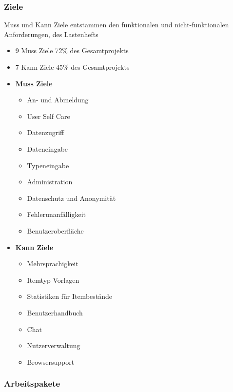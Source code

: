 \documentclass[11pt,a4paper]{report}
\begin{document}
\subsubsection{Ziele}

Muss und Kann Ziele entstammen den funktionalen und nicht-funktionalen Anforderungen, des Lastenhefts
  \begin{itemize}
  \item 9 Muss Ziele 72\% des Gesamtprojekts
  \item 7 Kann Ziele 45\% des Gesamtprojekts
  \end{itemize}



\begin{itemize}
\item[]
  \textbf{Muss Ziele}
  
  \begin{itemize}
  	\item
  		An- und Abmeldung
  	\item
  		User Self Care
	\item
  		Datenzugriff
	\item
 		Dateneingabe
	\item
  		Typeneingabe
	\item
  		Administration
	\item
  		Datenschutz und Anonymität
	\item
  		Fehlerunanfälligkeit
	\item
  		Benutzeroberfläche
  \end{itemize}

\item[]
  \textbf{Kann Ziele}
  
  \begin{itemize}
  	\item
  		Mehrsprachigkeit
	\item
  		Itemtyp Vorlagen
	\item
  		Statistiken für Itembestände
	\item
  		Benutzerhandbuch
	\item
  		Chat
	\item
  		Nutzerverwaltung
	\item
  		Browsersupport
  \end{itemize}
  
\end{itemize}

\newpage

\subsubsection{Arbeitspakete}\label{arbeitspakete}
\end{document}
